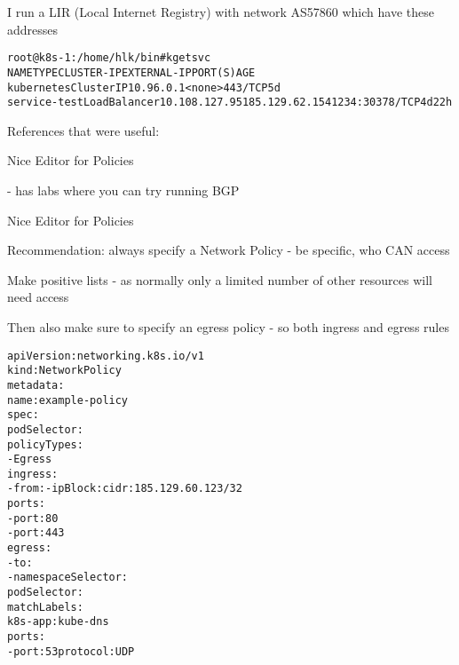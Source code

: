 \documentclass[Screen16to9,17pt]{foils}
\begin{document}
\begin{list2}
\item {}
\item I run a LIR (Local Internet Registry) with network AS57860 which have these addresses
\end{list2}




\begin{alltt}\footnotesize
root@k8s-1:/home/hlk/bin# k get svc
NAME           TYPE           CLUSTER-IP      EXTERNAL-IP      PORT(S)          AGE
kubernetes     ClusterIP      10.96.0.1       <none>           443/TCP          5d
service-test   LoadBalancer   10.108.127.95   185.129.62.154   1234:30378/TCP   4d22h
\end{alltt}

References that were useful:
\begin{list2}
\item Nice Editor for Policies 
\item {}
\item {}
\item {} - has labs where you can try running BGP
\end{list2}




\begin{list2}
\item Nice Editor for Policies 
\item Recommendation: always specify a Network Policy - be specific, who CAN access
\item Make positive lists - as normally only a limited number of other resources will need access
\item Then also make sure to specify an egress policy - so both ingress and egress rules
\end{list2}


\begin{alltt}\tiny
apiVersion: networking.k8s.io/v1
kind: NetworkPolicy
metadata:
  name: example-policy
spec:
  podSelector: {}
  policyTypes:
    - Egress
  ingress:
    - from: - ipBlock: cidr: 185.129.60.123/32
      ports:
        - port: 80
        - port: 443
  egress:
    - to:
        - namespaceSelector: {}
          podSelector:
            matchLabels:
              k8s-app: kube-dns
      ports:
        - port: 53          protocol: UDP
\end{alltt}
\end{document}
